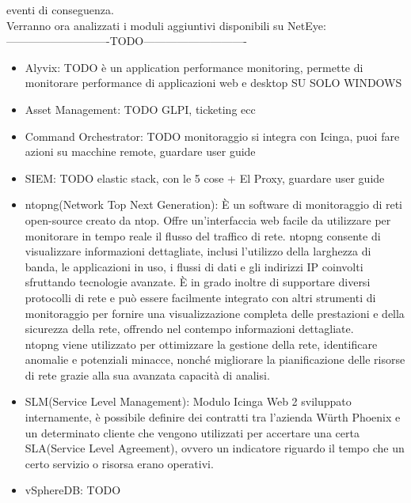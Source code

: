 eventi di conseguenza.\\ Verranno ora analizzati i moduli aggiuntivi disponibili
su NetEye: \\----------------------------TODO----------------------------
\begin{itemize}
  \item Alyvix: TODO è un application performance monitoring, permette di monitorare
    performance di applicazioni web e desktop SU SOLO WINDOWS

  \item Asset Management: TODO GLPI, ticketing ecc

  \item Command Orchestrator: TODO monitoraggio si integra con Icinga, puoi fare
    azioni su macchine remote, guardare user guide

  \item SIEM: TODO elastic stack, con le 5 cose + El Proxy, guardare user guide

  \item ntopng(Network Top Next Generation): È un software di monitoraggio di reti
    open-source creato da ntop. Offre un'interfaccia web facile da utilizzare
    per monitorare in tempo reale il flusso del traffico di rete. ntopng consente
    di visualizzare informazioni dettagliate, inclusi l'utilizzo della larghezza
    di banda, le applicazioni in uso, i flussi di dati e gli indirizzi IP
    coinvolti sfruttando tecnologie avanzate. È in grado inoltre di supportare diversi
    protocolli di rete e può essere facilmente integrato con altri strumenti di monitoraggio
    per fornire una visualizzazione completa delle prestazioni e della sicurezza
    della rete, offrendo nel contempo informazioni dettagliate.\\ ntopng viene
    utilizzato per ottimizzare la gestione della rete, identificare anomalie e potenziali
    minacce, nonché migliorare la pianificazione delle risorse di rete grazie
    alla sua avanzata capacità di analisi.

  \item SLM(Service Level Management): Modulo Icinga Web 2 sviluppato internamente,
    è possibile definire dei contratti tra l'azienda Würth Phoenix e un
    determinato cliente che vengono utilizzati per accertare una certa SLA(Service
    Level Agreement), ovvero un indicatore riguardo il tempo che un certo
    servizio o risorsa erano operativi.

  \item vSphereDB: TODO
\end{itemize}
